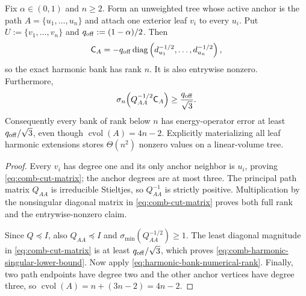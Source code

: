 \begin{proposition}
\label{prop:comb-harmonic-rank-obstruction}
Fix $\alpha\in(0,1)$ and $n\geq2$.  Form an unweighted tree whose active
anchor is the path $A=\{u_1,\ldots,u_n\}$ and attach one exterior leaf $v_i$
to every $u_i$.  Put $U:=\{v_1,\ldots,v_n\}$ and
$q_{\rm off}:=(1-\alpha)/2$.  Then
\begin{equation}
 \mathsf C_A
 =-q_{\rm off}\operatorname{diag}
   \left(d_{u_1}^{-1/2},\ldots,d_{u_n}^{-1/2}\right),
 \label{eq:comb-cut-matrix}
\end{equation}
so the exact harmonic bank has rank $n$.  It is also entrywise nonzero.
Furthermore,
\begin{equation}
 \sigma_n\!\left(Q_{AA}^{-1/2}\mathsf C_A\right)
 \geq\frac{q_{\rm off}}{\sqrt3}.
 \label{eq:comb-harmonic-singular-lower-bound}
\end{equation}
Consequently every bank of rank below $n$ has energy-operator error at least
$q_{\rm off}/\sqrt3$, even though
$\operatorname{cvol}(A)=4n-2$.  Explicitly materializing all leaf harmonic
extensions stores $\Theta(n^2)$ nonzero values on a linear-volume tree.
\end{proposition}

\begin{proof}
Every $v_i$ has degree one and its only anchor neighbor is $u_i$, proving
\cref{eq:comb-cut-matrix}; the anchor degrees are at most three.  The
principal path matrix $Q_{AA}$ is irreducible Stieltjes, so
$Q_{AA}^{-1}$ is strictly positive.  Multiplication by the nonsingular
diagonal matrix in \cref{eq:comb-cut-matrix} proves both full rank and the
entrywise-nonzero claim.

Since $Q\preceq I$, also $Q_{AA}\preceq I$ and
$\sigma_{\min}(Q_{AA}^{-1/2})\geq1$.  The least diagonal magnitude in
\cref{eq:comb-cut-matrix} is at least $q_{\rm off}/\sqrt3$, which proves
\cref{eq:comb-harmonic-singular-lower-bound}.  Now apply
\cref{eq:harmonic-bank-numerical-rank}.  Finally, two path endpoints have
degree two and the other anchor vertices have degree three, so
$\operatorname{cvol}(A)=n+(3n-2)=4n-2$.
\end{proof}

